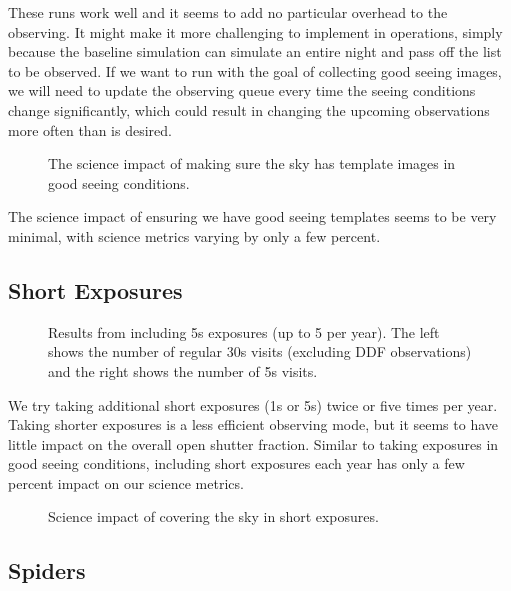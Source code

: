These runs work well and it seems to add no particular overhead to the observing. It might make it more challenging to implement in operations, simply because the baseline simulation can simulate an entire night and pass off the list to be observed. If we want to run with the goal of collecting good seeing images, we will need to update the observing queue every time the seeing conditions change significantly, which could result in changing the upcoming observations more often than is desired.

\begin{figure}
\caption{The science impact of making sure the sky has template images in good seeing conditions.}
\end{figure}

The science impact of ensuring we have good seeing templates seems to be very minimal, with science metrics varying by only a few percent. 

\subsection{Short Exposures}

\begin{figure}
\caption{Results from including 5s exposures (up to 5 per year). The left shows the number of regular 30s visits (excluding DDF observations) and the right shows the number of 5s visits.}
\end{figure}

We try taking additional short exposures (1s or 5s) twice or five times per year. Taking shorter exposures is a less efficient observing mode, but it seems to have little impact on the overall open shutter fraction. Similar to taking exposures in good seeing conditions, including short exposures each year has only a few percent impact on our science metrics.

\begin{figure}
\caption{Science impact of covering the sky in short exposures. }
\end{figure}

\subsection{Spiders}

